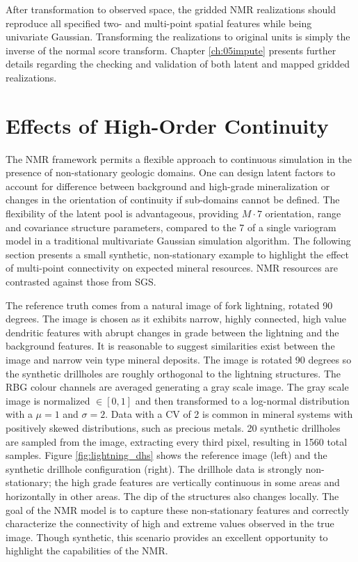 After transformation to observed space, the gridded \gls{NMR} realizations should reproduce all specified two- and multi-point spatial features while being univariate Gaussian. Transforming the realizations to original units is simply the inverse of the normal score transform. Chapter \ref{ch:05impute} presents further details regarding the checking and validation of both latent and mapped gridded realizations.


\FloatBarrier
\section{Effects of High-Order Continuity}
\label{sec:03effect}

The \gls{NMR} framework permits a flexible approach to continuous simulation in the presence of non-stationary geologic domains. One can design latent factors to account for difference between background and high-grade mineralization or changes in the orientation of continuity if sub-domains cannot be defined. The flexibility of the latent pool is advantageous, providing $M \cdot 7$ orientation, range and covariance structure parameters, compared to the 7 of a single variogram model in a traditional multivariate Gaussian simulation algorithm. The following section presents a small synthetic, non-stationary example to highlight the effect of multi-point connectivity on expected mineral resources. \Gls{NMR} resources are contrasted against those from \gls{SGS}.

The reference truth comes from a natural image of fork lightning, rotated 90 degrees. The image is chosen as it exhibits narrow, highly connected, high value dendritic features with abrupt changes in grade between the lightning and the background features. It is reasonable to suggest similarities exist between the image and narrow vein type mineral deposits. The image is rotated 90 degrees so the synthetic drillholes are roughly orthogonal to the lightning structures. The \gls{RBG} colour channels are averaged generating a gray scale image. The gray scale image is normalized $\in [0, 1]$ and then transformed to a log-normal distribution with a $\mu = 1$ and $\sigma = 2$. Data with a \gls{CV} of 2 is common in mineral systems with positively skewed distributions, such as precious metals. 20 synthetic drillholes are sampled from the image, extracting every third pixel, resulting in 1560 total samples. Figure \ref{fig:lightning_dhs} shows the reference image (left) and the synthetic drillhole configuration (right). The drillhole data is strongly non-stationary; the high grade features are vertically continuous in some areas and horizontally in other areas. The dip of the structures also changes locally. The goal of the \gls{NMR} model is to capture these non-stationary features and correctly characterize the connectivity of high and extreme values observed in the true image. Though synthetic, this scenario provides an excellent opportunity to highlight the capabilities of the \gls{NMR}.

